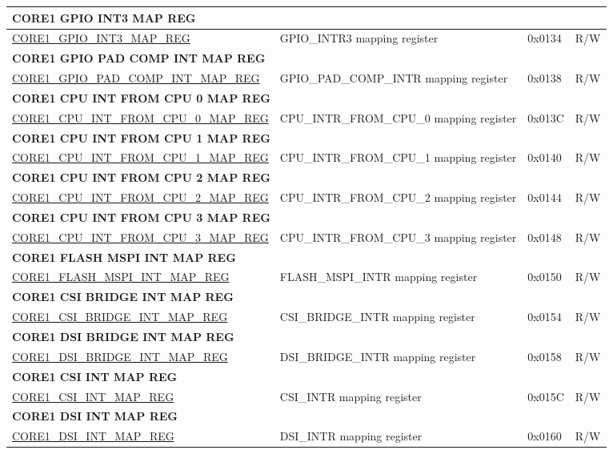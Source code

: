 \begin{longtable}{ | p{7.5cm} | p{7.2cm} | p{1.3cm} | p{1cm} | }
\multicolumn{4}{|l|}{\textbf{CORE1 GPIO INT3 MAP REG}} \\ \hline
\hyperref[regdesc:CORE1GPIOINT3MAPREG]{CORE1\_GPIO\_INT3\_MAP\_REG} & GPIO\_INTR3 mapping register & 0x0134 & R/W \\ \hline
\multicolumn{4}{|l|}{\textbf{CORE1 GPIO PAD COMP INT MAP REG}} \\ \hline
\hyperref[regdesc:CORE1GPIOPADCOMPINTMAPREG]{CORE1\_GPIO\_PAD\_COMP\_INT\_MAP\_REG} & GPIO\_PAD\_COMP\_INTR mapping register & 0x0138 & R/W \\ \hline
\multicolumn{4}{|l|}{\textbf{CORE1 CPU INT FROM CPU 0 MAP REG}} \\ \hline
\hyperref[regdesc:CORE1CPUINTFROMCPU0MAPREG]{CORE1\_CPU\_INT\_FROM\_CPU\_0\_MAP\_REG} & CPU\_INTR\_FROM\_CPU\_0 mapping register & 0x013C & R/W \\ \hline
\multicolumn{4}{|l|}{\textbf{CORE1 CPU INT FROM CPU 1 MAP REG}} \\ \hline
\hyperref[regdesc:CORE1CPUINTFROMCPU1MAPREG]{CORE1\_CPU\_INT\_FROM\_CPU\_1\_MAP\_REG} & CPU\_INTR\_FROM\_CPU\_1 mapping register & 0x0140 & R/W \\ \hline
\multicolumn{4}{|l|}{\textbf{CORE1 CPU INT FROM CPU 2 MAP REG}} \\ \hline
\hyperref[regdesc:CORE1CPUINTFROMCPU2MAPREG]{CORE1\_CPU\_INT\_FROM\_CPU\_2\_MAP\_REG} & CPU\_INTR\_FROM\_CPU\_2 mapping register & 0x0144 & R/W \\ \hline
\multicolumn{4}{|l|}{\textbf{CORE1 CPU INT FROM CPU 3 MAP REG}} \\ \hline
\hyperref[regdesc:CORE1CPUINTFROMCPU3MAPREG]{CORE1\_CPU\_INT\_FROM\_CPU\_3\_MAP\_REG} & CPU\_INTR\_FROM\_CPU\_3 mapping register & 0x0148 & R/W \\ \hline
\multicolumn{4}{|l|}{\textbf{CORE1 FLASH MSPI INT MAP REG}} \\ \hline
\hyperref[regdesc:CORE1FLASHMSPIINTMAPREG]{CORE1\_FLASH\_MSPI\_INT\_MAP\_REG} & FLASH\_MSPI\_INTR mapping register & 0x0150 & R/W \\ \hline
\multicolumn{4}{|l|}{\textbf{CORE1 CSI BRIDGE INT MAP REG}} \\ \hline
\hyperref[regdesc:CORE1CSIBRIDGEINTMAPREG]{CORE1\_CSI\_BRIDGE\_INT\_MAP\_REG} & CSI\_BRIDGE\_INTR mapping register & 0x0154 & R/W \\ \hline
\multicolumn{4}{|l|}{\textbf{CORE1 DSI BRIDGE INT MAP REG}} \\ \hline
\hyperref[regdesc:CORE1DSIBRIDGEINTMAPREG]{CORE1\_DSI\_BRIDGE\_INT\_MAP\_REG} & DSI\_BRIDGE\_INTR mapping register & 0x0158 & R/W \\ \hline
\multicolumn{4}{|l|}{\textbf{CORE1 CSI INT MAP REG}} \\ \hline
\hyperref[regdesc:CORE1CSIINTMAPREG]{CORE1\_CSI\_INT\_MAP\_REG} & CSI\_INTR mapping register & 0x015C & R/W \\ \hline
\multicolumn{4}{|l|}{\textbf{CORE1 DSI INT MAP REG}} \\ \hline
\hyperref[regdesc:CORE1DSIINTMAPREG]{CORE1\_DSI\_INT\_MAP\_REG} & DSI\_INTR mapping register & 0x0160 & R/W \\ \hline


\end{longtable}
